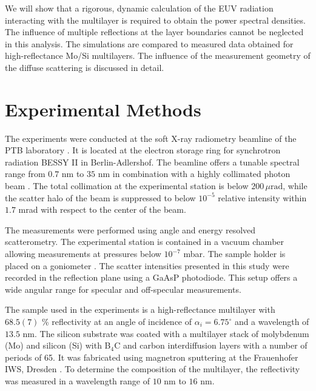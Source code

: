 We will show that a rigorous, dynamic calculation of the EUV radiation interacting with the multilayer is required to obtain the power spectral densities. The influence of multiple reflections at the layer boundaries cannot be neglected in this analysis. The simulations are compared to measured data obtained for high-reflectance Mo/Si multilayers. The influence of the measurement geometry of the diffuse scattering is discussed in detail.

\section{Experimental Methods} \label{sec:experimental} The experiments were conducted at the soft X-ray radiometry beamline of the PTB laboratory \cite{Beckhoff2009}. It is located at the electron storage ring for synchrotron radiation BESSY II in Berlin-Adlershof. The beamline offers a tunable spectral range from $0.7$ nm to $35$ nm in combination with a highly collimated photon beam \cite{ptbbeamline}. The total collimation at the experimental station is below $200\,\mu\text{rad}$, while the scatter halo of the beam is suppressed to below $10^{-5}$ relative intensity within $1.7$ mrad with respect to the center of the beam.

The measurements were performed using angle and energy resolved scatterometry. The experimental station is contained in a vacuum chamber allowing measurements at pressures below $10^{-7}$ mbar. The sample holder is placed on a goniometer \cite{PTBBigRef}. The scatter intensities presented in this study were recorded in the reflection plane using a GaAsP photodiode. This setup offers a wide angular range for specular and off-specular measurements. 

The sample used in the experiments is a high-reflectance multilayer with $68.5(7)$ \% reflectivity at an angle of incidence of $\alpha_i = 6.75^\circ$ and a wavelength of $13.5$ nm. The silicon substrate was coated with a multilayer stack of molybdenum (Mo) and silicon (Si) with B$_4$C and carbon interdiffusion layers with a number of periods of 65. It was fabricated using magnetron sputtering at the Frauenhofer IWS, Dresden \cite{braun2002mo}. To determine the composition of the multilayer, the reflectivity was measured in a wavelength range of $10$ nm to $16$ nm. 

